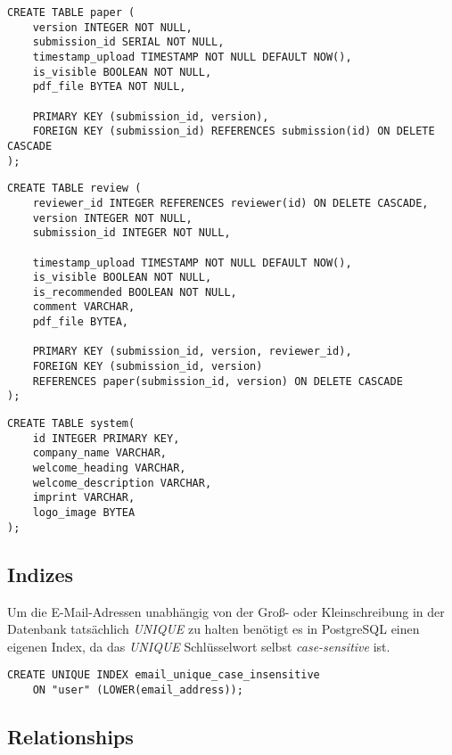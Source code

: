 \begin{lstlisting}[caption={DDL von Papers}]
CREATE TABLE paper (
	version INTEGER NOT NULL,
	submission_id SERIAL NOT NULL,
	timestamp_upload TIMESTAMP NOT NULL DEFAULT NOW(),
	is_visible BOOLEAN NOT NULL,
	pdf_file BYTEA NOT NULL,

	PRIMARY KEY (submission_id, version),
	FOREIGN KEY (submission_id) REFERENCES submission(id) ON DELETE CASCADE
);
\end{lstlisting}

\begin{lstlisting}[caption={DDL von Gutachten}]
CREATE TABLE review (
	reviewer_id INTEGER REFERENCES reviewer(id) ON DELETE CASCADE,
	version INTEGER NOT NULL,
	submission_id INTEGER NOT NULL,

	timestamp_upload TIMESTAMP NOT NULL DEFAULT NOW(),
	is_visible BOOLEAN NOT NULL,
	is_recommended BOOLEAN NOT NULL,
	comment VARCHAR,
	pdf_file BYTEA,

	PRIMARY KEY (submission_id, version, reviewer_id),
	FOREIGN KEY (submission_id, version)
	REFERENCES paper(submission_id, version) ON DELETE CASCADE
);
\end{lstlisting}

\begin{lstlisting}[caption={DDL von den Systemeinstellungen}]
CREATE TABLE system(
	id INTEGER PRIMARY KEY,
	company_name VARCHAR,
	welcome_heading VARCHAR,
	welcome_description VARCHAR,
	imprint VARCHAR,
	logo_image BYTEA
);
\end{lstlisting}

\subsection{Indizes}

Um die E-Mail-Adressen unabhängig von der Groß- oder Kleinschreibung in der Datenbank tatsächlich \emph{UNIQUE} zu halten benötigt es in PostgreSQL einen eigenen Index, da das \emph{UNIQUE} Schlüsselwort selbst \emph{case-sensitive} ist.\\

\begin{lstlisting}[caption={DDL des UNIQUE Index auf E-Mail-Adressen}]
CREATE UNIQUE INDEX email_unique_case_insensitive
	ON "user" (LOWER(email_address));
\end{lstlisting}

\subsection{Relationships}


